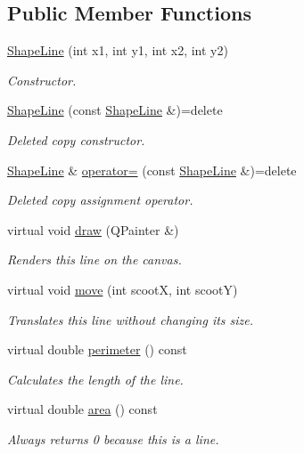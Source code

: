 \subsection*{Public Member Functions}
\begin{DoxyCompactItemize}
\item 
\mbox{\hyperlink{class_shape_line_a64e5a4ebb948b249de5bd26ec09cbb43}{Shape\+Line}} (int x1, int y1, int x2, int y2)
\begin{DoxyCompactList}\small\item\em Constructor. \end{DoxyCompactList}\item 
\mbox{\hyperlink{class_shape_line_a4acb4bc45f72c1c812fc1eb46ff1fec5}{Shape\+Line}} (const \mbox{\hyperlink{class_shape_line}{Shape\+Line}} \&)=delete
\begin{DoxyCompactList}\small\item\em Deleted copy constructor. \end{DoxyCompactList}\item 
\mbox{\hyperlink{class_shape_line}{Shape\+Line}} \& \mbox{\hyperlink{class_shape_line_a4c9674af8f603496953ba824ba70dfc7}{operator=}} (const \mbox{\hyperlink{class_shape_line}{Shape\+Line}} \&)=delete
\begin{DoxyCompactList}\small\item\em Deleted copy assignment operator. \end{DoxyCompactList}\item 
virtual void \mbox{\hyperlink{class_shape_line_a8b4dbfe05387934a0f9c4a053a798239}{draw}} (Q\+Painter \&)
\begin{DoxyCompactList}\small\item\em Renders this line on the canvas. \end{DoxyCompactList}\item 
virtual void \mbox{\hyperlink{class_shape_line_a5b6d9bcf7ed64ab2454d5efa66486ee9}{move}} (int scootX, int scootY)
\begin{DoxyCompactList}\small\item\em Translates this line without changing its size. \end{DoxyCompactList}\item 
virtual double \mbox{\hyperlink{class_shape_line_a68b22013926993e9bd9c2d146519a5af}{perimeter}} () const
\begin{DoxyCompactList}\small\item\em Calculates the length of the line. \end{DoxyCompactList}\item 
virtual double \mbox{\hyperlink{class_shape_line_a6f33bdd78706ad73e570b4ba53bbc00b}{area}} () const
\begin{DoxyCompactList}\small\item\em Always returns 0 because this is a line. \end{DoxyCompactList}\end{DoxyCompactItemize}
